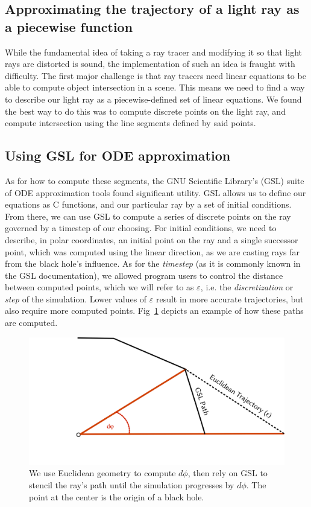\subsection{Approximating the trajectory of a light ray as a piecewise function}
While the fundamental idea of taking a ray tracer and modifying it so that light rays are distorted is sound, the implementation of such an idea is fraught with difficulty. The first major challenge is that ray tracers need linear equations to be able to compute object intersection in a scene. This means we need to find a way to describe our light ray as a piecewise-defined set of linear equations. We found the best way to do this was to compute discrete points on the light ray, and compute intersection using the line segments defined by said points. 


\subsection{Using GSL for ODE approximation}
As for how to compute these segments, the GNU Scientific Library's (GSL) suite \cite{10.5555/1538674} of ODE approximation tools found significant utility. GSL allows us to define our equations as C functions, and our particular ray by a set of initial conditions. From there, we can use GSL to compute a series of discrete points on the ray governed by a timestep of our choosing. For initial conditions, we need to describe, in polar coordinates, an initial point on the ray and a single successor point, which was computed using the linear direction, as we are casting rays far from the black hole's influence. As for the \textit{timestep} (as it is commonly known in the GSL documentation), we allowed program users to control the distance between computed points, which we will refer to as $\varepsilon$, i.e. the \textit{discretization} or \textit{step} of the simulation. Lower values of $\varepsilon$ result in more accurate trajectories, but also require more computed points. Fig~\ref{fig:nextpoint} depicts an example of how these paths are computed.

\begin{figure}[h]
  \centering
  \includegraphics[width=.65\linewidth]{figs/nextpoint}
  \caption{We use Euclidean geometry to compute $d\phi$, then rely on GSL to stencil the ray's path until the simulation progresses by $d\phi$. The point at the center is the origin of a black hole.}
  \label{fig:nextpoint}
\end{figure}

